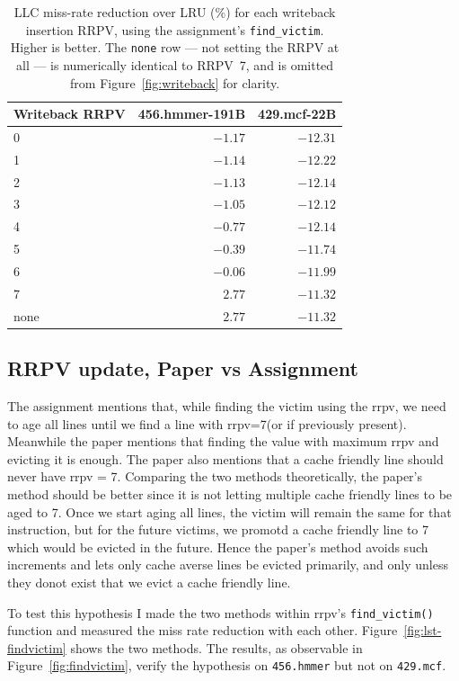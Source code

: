 \documentclass[11pt]{article}
\begin{document}
\begin{table}[H]
\centering
\begin{tabular}{lrr}
\toprule
Writeback RRPV & 456.hmmer-191B & 429.mcf-22B \\
\midrule
0    & $-1.17$ & $-12.31$ \\
1    & $-1.14$ & $-12.22$ \\
2    & $-1.13$ & $-12.14$ \\
3    & $-1.05$ & $-12.12$ \\
4    & $-0.77$ & $-12.14$ \\
5    & $-0.39$ & $-11.74$ \\
6    & $-0.06$ & $-11.99$ \\
7    & $2.77$  & $-11.32$ \\
none & $2.77$  & $-11.32$ \\
\bottomrule
\end{tabular}
\caption{LLC miss-rate reduction over LRU (\%) for each writeback insertion RRPV,
using the assignment's \texttt{find\_victim}. Higher is better. The \texttt{none}
row --- not setting the RRPV at all --- is numerically identical to RRPV~7, and is
omitted from Figure~\ref{fig:writeback} for clarity.}
\label{tab:writeback}
\end{table}


\subsection{RRPV update, Paper vs Assignment}

The assignment mentions that, while finding the victim using the rrpv, we need to age all lines until we find a line with rrpv=7(or if previously present). Meanwhile the paper mentions that finding the value with maximum rrpv and evicting it is enough. The paper also mentions that a cache friendly line should never have rrpv = 7. Comparing the two methods theoretically, the paper's method should be better since it is not letting multiple cache friendly lines to be aged to 7. Once we start aging all lines, the victim will remain the same for that instruction, but for the future victims, we promotd a cache friendly line to 7 which would be evicted in the future. Hence the paper's method avoids such increments and lets only cache averse lines be evicted primarily, and only unless they donot exist that we evict a cache friendly line.

To test this hypothesis I made the two methods within rrpv's \texttt{find\_victim()} function and measured the miss rate reduction with each other. Figure~\ref{fig:lst-findvictim} shows the two methods. The results, as observable in Figure~\ref{fig:findvictim}, verify the hypothesis on
\texttt{456.hmmer} but not on \texttt{429.mcf}.
\end{document}
